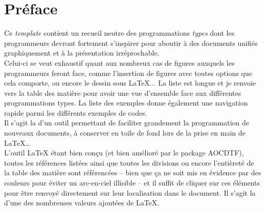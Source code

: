 \documentclass[a4paper, 11pt, twoside, fleqn]{memoir}
\begin{document}

	\chapter{Préface}

Ce \emph{template} contient un recueil neutre des programmations \emph{types} dont les programmeurs devront fortement s'inspirer pour aboutir à des documents unifiés graphiquement et à la présentation irréprochable.\\

Celui-ci se veut exhaustif quant aux nombreux cas de figures auxquels les programmeurs feront face, comme l'insertion de figures avec toutes options que cela comporte, ou encore le dessin sous \LaTeX{}... La liste est longue et je renvoie vers la table des matière pour avoir une vue d'ensemble face aux différentes programmations types. La liste des exemples donne également une navigation rapide parmi les différents exemples de codes.\\ 
Il s'agit la d'un outil permettant de faciliter grandement la programmation de nouveaux documents, à conserver en toile de fond lors de la prise en main de \LaTeX{}\ldots\\

L'outil \LaTeX{} étant bien conçu (et bien amélioré par le package AOCDTF), toutes les références listées ainsi que toutes les divisions ou encore l'entièreté de la table des matière sont référencées -- bien que ça ne soit mis en évidence par des couleurs pour éviter un arc-en-ciel illisible -- et il suffit de cliquer sur ces éléments pour être renvoyé directement sur leur localisation dans le document. Il s'agit la d'une des nombreuses valeurs ajoutées de \LaTeX{}.
\end{document}
